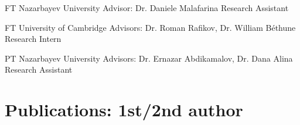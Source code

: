 \documentclass[10pt]{article} %
\begin{document}
\begin{paracol}{1}



{FT} %
{Nazarbayev University} %
{Advisor: Dr. Daniele Malafarina} %
{Research Assistant}  %


{FT} %
{University of Cambridge} %
{Advisors: Dr. Roman Rafikov, Dr. William B\'ethune} %
{Research Intern} %


{PT} %
{Nazarbayev University} %
{Advisors: Dr. Ernazar Abdikamalov, Dr. Dana Alina} %
{Research Assistant} %


\vspace*{1mm} %


\section{Publications: 1st/2nd author}


\end{paracol}
\end{document}
